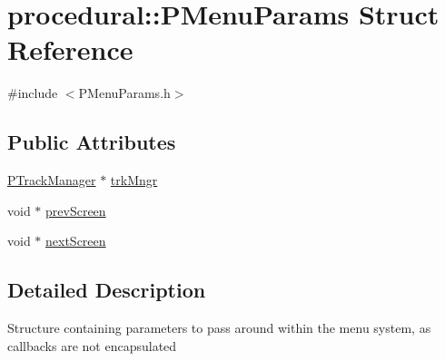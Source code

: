 \hypertarget{structprocedural_1_1_p_menu_params}{\section{procedural\-:\-:P\-Menu\-Params Struct Reference}
\label{structprocedural_1_1_p_menu_params}
}


{\ttfamily \#include $<$P\-Menu\-Params.\-h$>$}

\subsection*{Public Attributes}
\begin{DoxyCompactItemize}
\item 
\hyperlink{classprocedural_1_1_p_track_manager}{P\-Track\-Manager} $\ast$ \hyperlink{structprocedural_1_1_p_menu_params_ad7cf8a5c5194d7a73e957bbd5d309d18}{trk\-Mngr}
\item 
void $\ast$ \hyperlink{structprocedural_1_1_p_menu_params_ae1078aa601864c8327fe2935f649269c}{prev\-Screen}
\item 
void $\ast$ \hyperlink{structprocedural_1_1_p_menu_params_a04e86634b8236fdc94d8c68607e582d1}{next\-Screen}
\end{DoxyCompactItemize}


\subsection{Detailed Description}
Structure containing parameters to pass around within the menu system, as callbacks are not encapsulated 

